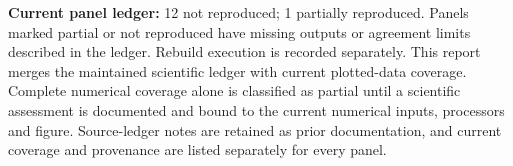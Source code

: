 \textbf{Current panel ledger:} 12 not reproduced; 1 partially reproduced.
Panels marked partial or not reproduced have missing outputs or agreement limits described in the ledger. Rebuild execution is recorded separately.
This report merges the maintained scientific ledger with current plotted-data coverage. Complete numerical coverage alone is classified as partial until a scientific assessment is documented and bound to the current numerical inputs, processors and figure. Source-ledger notes are retained as prior documentation, and current coverage and provenance are listed separately for every panel.
